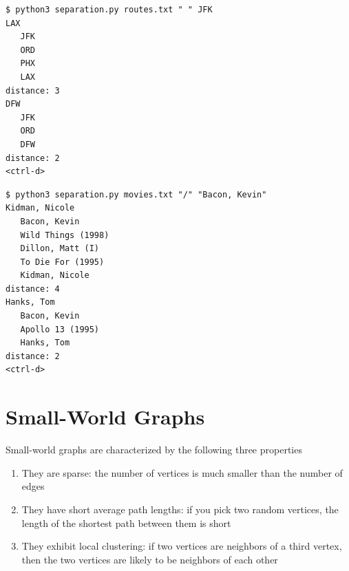 \documentclass[8pt,a4paper,compress]{beamer}
\begin{document}
\begin{frame}[fragile]
\pause

\begin{lstlisting}[language={},style=focusin]
$ python3 separation.py routes.txt " " JFK
LAX   
   JFK
   ORD
   PHX
   LAX
distance: 3
DFW
   JFK
   ORD
   DFW
distance: 2
<ctrl-d>
\end{lstlisting}

\pause

\begin{lstlisting}[language={},style=focusin]
$ python3 separation.py movies.txt "/" "Bacon, Kevin"
Kidman, Nicole
   Bacon, Kevin
   Wild Things (1998)
   Dillon, Matt (I)
   To Die For (1995)
   Kidman, Nicole
distance: 4
Hanks, Tom
   Bacon, Kevin
   Apollo 13 (1995)
   Hanks, Tom
distance: 2
<ctrl-d>
\end{lstlisting}
\end{frame}

\section{Small-World Graphs}
\begin{frame}[fragile]
\pause

Small-world graphs are characterized by the following three properties

\begin{enumerate}
\item They are sparse: the number of vertices is much smaller than the number of edges

\item They have short average path lengths: if you pick two random vertices, the length of the shortest path between them is short

\item They exhibit local clustering: if two vertices are neighbors of a third vertex, then the two vertices are likely to be neighbors of each other
\end{enumerate}
\end{frame}
\end{document}
